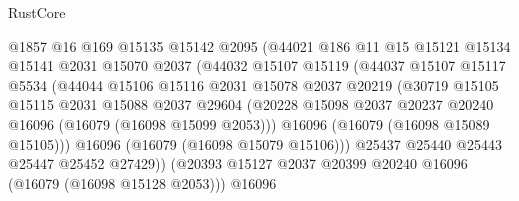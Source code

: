 \begin{lexlean}{RustCore}
\begin{coremodule}
                            @1857
                            @16
                            @169
                            @15135
                            @15142
                            @2095
                            (@44021
                              @186
                              @11
                              @15
                              @15121
                              @15134
                              @15141
                              @2031
                              @15070
                              @2037
                              (@44032
                                @15107
                                @15119
                                (@44037
                                  @15107
                                  @15117
                                  @5534
                                  (@44044
                                    @15106
                                    @15116
                                    @2031
                                    @15078
                                    @2037
                                    @20219
                                    (@30719
                                      @15105
                                      @15115
                                      @2031
                                      @15088
                                      @2037
                                      @29604
                                      (@20228
                                        @15098
                                        @2037
                                        @20237
                                        @20240
                                        @16096
                                        (@16079 (@16098 @15099 @2053)))
                                      @16096
                                      (@16079 (@16098 @15089 @15105)))
                                    @16096
                                    (@16079 (@16098 @15079 @15106)))
                                  @25437
                                  @25440
                                  @25443
                                  @25447
                                  @25452
                                  @27429))
                              (@20393
                                @15127
                                @2037
                                @20399
                                @20240
                                @16096
                                (@16079 (@16098 @15128 @2053)))
                              @16096

\end{coremodule}
\end{lexlean}
